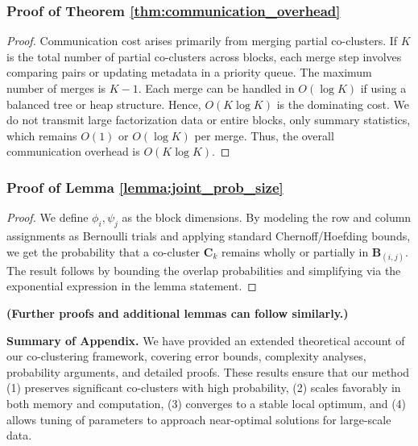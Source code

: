 \documentclass[journal]{IEEEtran}
\begin{document}
\subsubsection{Proof of Theorem \ref{thm:communication_overhead}}
\begin{proof}
    Communication cost arises primarily from merging partial co-clusters. If $K$ is the total number of partial co-clusters across blocks, each merge step involves comparing pairs or updating metadata in a priority queue. The maximum number of merges is $K-1$. Each merge can be handled in $O(\log K)$ if using a balanced tree or heap structure. Hence, $O(K\log K)$ is the dominating cost. We do not transmit large factorization data or entire blocks, only summary statistics, which remains $O(1)$ or $O(\log K)$ per merge. Thus, the overall communication overhead is $O(K\log K)$.
\end{proof}

\subsubsection{Proof of Lemma \ref{lemma:joint_prob_size}}
\begin{proof}
    We define $\phi_i,\psi_j$ as the block dimensions. By modeling the row and column assignments as Bernoulli trials and applying standard Chernoff/Hoefding bounds, we get the probability that a co-cluster $\mathbf{C}_k$ remains wholly or partially in $\mathbf{B}_{(i,j)}$. The result follows by bounding the overlap probabilities and simplifying via the exponential expression in the lemma statement.
\end{proof}

\noindent \textbf{(Further proofs and additional lemmas can follow similarly.)}

\vspace{1em}
\noindent
\textbf{Summary of Appendix.} We have provided an extended theoretical account of our co-clustering framework, covering error bounds, complexity analyses, probability arguments, and detailed proofs. These results ensure that our method (1) preserves significant co-clusters with high probability, (2) scales favorably in both memory and computation, (3) converges to a stable local optimum, and (4) allows tuning of parameters to approach near-optimal solutions for large-scale data.
\end{document}

